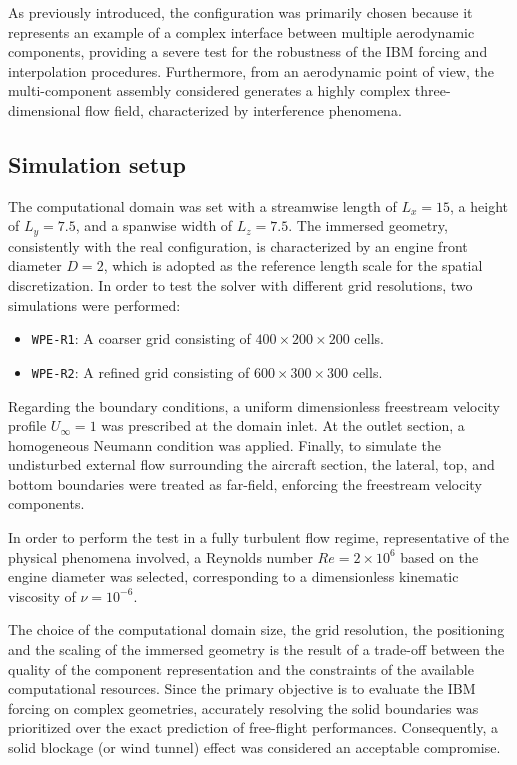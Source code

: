 \documentclass[12pt, a4paper, twoside, openright]{book}
\begin{document}
As previously introduced, the configuration was primarily chosen because it represents an example of a complex interface between multiple aerodynamic components, providing a severe test for the robustness of the IBM forcing and interpolation procedures. Furthermore, from an aerodynamic point of view, the multi-component assembly considered generates a highly complex three-dimensional flow field, characterized by interference phenomena.

\subsection{Simulation setup}
The computational domain was set with a streamwise length of $L_x = 15$, a height of $L_y = 7.5$, and a spanwise width of $L_z = 7.5$. The immersed geometry, consistently with the real configuration, is characterized by an engine front diameter $D = 2$, which is adopted as the reference length scale for the spatial discretization. In order to test the solver with different grid resolutions, two simulations were performed:
\begin{itemize}
	\item \texttt{WPE-R1}: A coarser grid consisting of $400 \times 200 \times 200$ cells.
	\item \texttt{WPE-R2}: A refined grid consisting of $600 \times 300 \times 300$ cells.
\end{itemize} 
%
Regarding the boundary conditions, a uniform dimensionless freestream velocity profile $U_{\infty} = 1$ was prescribed at the domain inlet. At the outlet section, a homogeneous Neumann condition was applied. Finally, to simulate the undisturbed external flow surrounding the aircraft section, the lateral, top, and bottom boundaries were treated as far-field, enforcing the freestream velocity components.

In order to perform the test in a fully turbulent flow regime, representative of the physical phenomena involved, a Reynolds number $Re = 2 \times 10^6$ based on the engine diameter was selected, corresponding to a dimensionless kinematic viscosity of $\nu = 10^{-6}$.

The choice of the computational domain size, the grid resolution, the positioning and the scaling of the immersed geometry is the result of a trade-off between the quality of the component representation and the constraints of the available computational resources. Since the primary objective is to evaluate the IBM forcing on complex geometries, accurately resolving the solid boundaries was prioritized over the exact prediction of free-flight performances. Consequently, a solid blockage (or wind tunnel) effect was considered an acceptable compromise.
\end{document}
